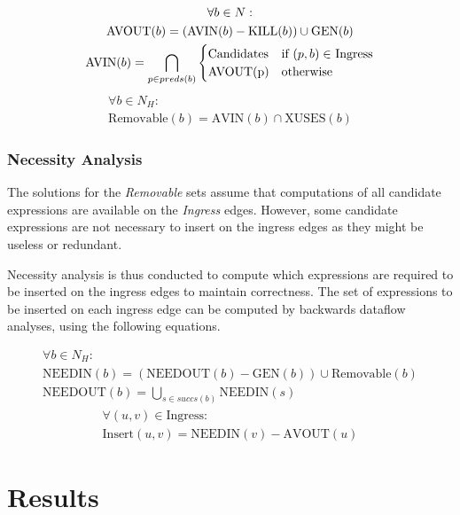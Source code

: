 \documentclass[sigplan,screen]{acmart}
\begin{document}
    \begin{multline*}
    \forall b \in N:\\
    \textrm{AVOUT}(b) = (\textrm{AVIN}(b) - \textrm{KILL}(b)) \cup \textrm{GEN}(b)\\
    \textrm{AVIN}(b) = \underset{p \in preds(b)}{\bigcap}
    \begin{cases}
      \text{Candidates} & \text{if $(p,b) \in $ Ingress}\\
      \text{AVOUT}($p$)& \text{otherwise}
    \end{cases}  
    \end{multline*}
    \begin{multline*}
    \forall b \in N_H:\\  
    \textrm{Removable}(b) = \textrm{AVIN}(b) \cap \textrm{XUSES}(b)
    \end{multline*}

    \subsubsection{Necessity Analysis}
    
    The solutions for the \emph{Removable} sets assume that computations of all candidate expressions are available on the \emph{Ingress} edges. However, some candidate expressions are not necessary to insert on the ingress edges as they might be useless or redundant. 

    Necessity analysis is thus conducted to compute which expressions are required to be inserted on the ingress edges to maintain correctness. The set of expressions to be inserted on each ingress edge can be computed by backwards dataflow analyses, using the following equations.

    \begin{multline*}
    \forall b \in N_H:\\
    \textrm{NEEDIN}(b) = (\textrm{NEEDOUT}(b) - \textrm{GEN}(b)) \cup \textrm{Removable}(b)\\
    \textrm{NEEDOUT}(b) = \underset{s \in succs(b)}{\bigcup} \textrm{NEEDIN}(s)
    \end{multline*}
    \begin{multline*}
    \forall (u,v) \in \textrm{Ingress}:\\  
    \textrm{Insert}(u,v) = \textrm{NEEDIN}(v) - \textrm{AVOUT}(u)
    \end{multline*}

    \section{Results}
	\label{sec:results}
\end{document}

